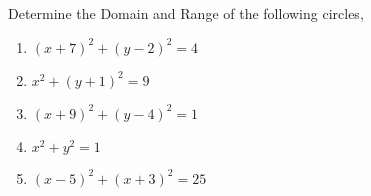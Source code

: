 \documentclass[12pt]{article} %
\begin{document}
\begin{qstn}
  Determine the Domain and Range of the following circles,
  \begin{enumerate}[label=(\alph*)]
		\item $(x + 7)^2 + (y-2)^2 = 4$
		\item $x^2 + (y+1)^2 = 9$
		\item $(x+9)^2 + (y - 4)^2 = 1$
		\item $x^2 + y^2 = 1$
		\item $(x-5)^2 + (x+3)^2 = 25$
  \end{enumerate}

\end{qstn}
\end{document}

